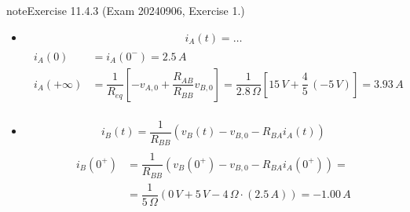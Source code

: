 \documentclass[letterpaper,10pt,english]{jupyterBook}
\begin{document}
\begin{sphinxadmonition}{note}{Exercise 11.4.3 (Exam 2024\sphinxhyphen{}09\sphinxhyphen{}06, Exercise 1.)}
\begin{itemize}
\sphinxAtStartPar
Numerical values
\begin{equation*}
\begin{split}\begin{aligned}
    \tau & = \dfrac{L}{R_{eq}} = \dfrac{0.1 \, H}{2.8 \, \Omega} = 3.57 \cdot 10^{-2} \, s  \\
    R_{eq} & = \dfrac{\det \mathbf{R}}{R_{BB}} = \dfrac{14 \, \Omega^2}{5 \, \Omega} = 2.8 \, \Omega \\
    \det \mathbf{R} & = R_{AA} R_{BB} - R_{AB} R_{BA} = \\
                    & = (R_1 + R_4)(R_2 + R_4) - R_4^2 = ( 30 - 16 ) \Omega^2 = 14 \, \Omega^2
  \end{aligned}\end{split}
\end{equation*}
\item {} 
\sphinxAtStartPar
{}
\begin{equation*}
\begin{split}i_A(t) = \dots \end{split}
\end{equation*}\begin{equation*}
\begin{split}\begin{aligned}
      i_A(0) & = i_A(0^-) = 2.5 \, A \\
      i_A(+\infty) & = \dfrac{1}{R_{eq}} \left[ - v_{A,0} + \dfrac{R_{AB}}{R_{BB}} v_{B,0} \right] = \dfrac{1}{2.8 \, \Omega} \left[ 15 \, V + \dfrac{4}{5} \, ( - 5 \, V ) \right] = 3.93 \, A
   \end{aligned}\end{split}
\end{equation*}
\item {} 
\sphinxAtStartPar
{}
\begin{equation*}
\begin{split}i_B(t) = \dfrac{1}{R_{BB}} \left( v_B(t) - v_{B,0} - R_{BA} i_A(t) \right)\end{split}
\end{equation*}\begin{equation*}
\begin{split}\begin{aligned}
     i_B(0^+)     & = \dfrac{1}{R_{BB}} \left( v_B(0^+    ) - v_{B,0} - R_{BA} i_A(0^+    ) \right) = \\
                  & = \dfrac{1}{5 \, \Omega} \left( 0 \, V + 5 \, V  - 4 \, \Omega \cdot (2.5 \, A) \right) = -1.00 \, A \\

\end{aligned}
\end{split}
\end{equation*}
\end{itemize}
\end{sphinxadmonition}
\end{document}

